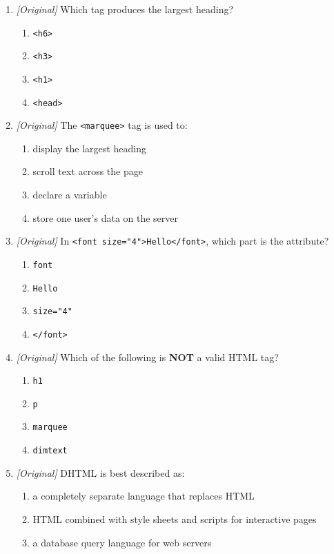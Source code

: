 \documentclass[11pt]{article}
\begin{document}
\begin{enumerate}[label=\textbf{Q\arabic*.}, leftmargin=*]
\begin{enumerate}[label=\Alph*.]
  \end{enumerate}
\item \textit{[Original]} Which tag produces the largest heading?
  \begin{enumerate}[label=\Alph*.]
    \item \texttt{<h6>}
    \item \texttt{<h3>}
    \item \texttt{<h1>}
    \item \texttt{<head>}
  \end{enumerate}
\item \textit{[Original]} The \texttt{<marquee>} tag is used to:
  \begin{enumerate}[label=\Alph*.]
    \item display the largest heading
    \item scroll text across the page
    \item declare a variable
    \item store one user's data on the server
  \end{enumerate}
\item \textit{[Original]} In \texttt{<font size="4">Hello</font>}, which part
  is the attribute?
  \begin{enumerate}[label=\Alph*.]
    \item \texttt{font}
    \item \texttt{Hello}
    \item \texttt{size="4"}
    \item \texttt{</font>}
  \end{enumerate}
\item \textit{[Original]} Which of the following is \textbf{NOT} a valid HTML
  tag?
  \begin{enumerate}[label=\Alph*.]
    \item \texttt{h1}
    \item \texttt{p}
    \item \texttt{marquee}
    \item \texttt{dimtext}
  \end{enumerate}
\item \textit{[Original]} DHTML is best described as:
  \begin{enumerate}[label=\Alph*.]
    \item a completely separate language that replaces HTML
    \item HTML combined with style sheets and scripts for interactive pages
    \item a database query language for web servers

\end{enumerate}
\end{enumerate}
\end{document}
